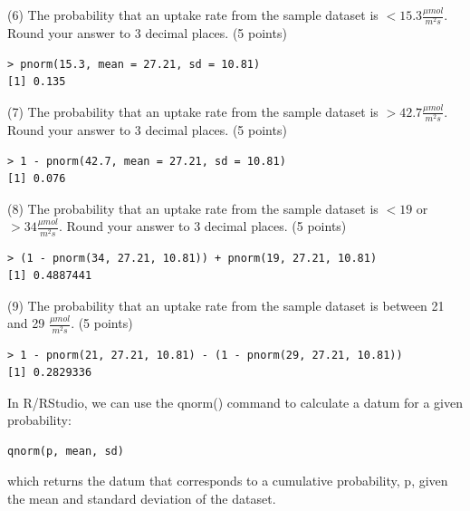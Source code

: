 \documentclass{article}
\begin{document}
 

(6) The probability that an uptake rate from the sample dataset is $<15.3 \frac{\mu mol}{m^{2}s}$. Round your answer to 3 decimal places. (5 points)

\begin{center}
\begin{lstlisting}
> pnorm(15.3, mean = 27.21, sd = 10.81)
[1] 0.135
\end{lstlisting}
\end{center}

(7) The probability that an uptake rate from the sample dataset is $>42.7 \frac{\mu mol}{m^{2}s}$. Round your answer to 3 decimal places. (5 points)

\begin{center}
\begin{lstlisting}
> 1 - pnorm(42.7, mean = 27.21, sd = 10.81)
[1] 0.076
\end{lstlisting}
\end{center}

(8) The probability that an uptake rate from the sample dataset is $< 19$ or $>34 \frac{\mu mol}{m^{2}s}$. Round your answer to 3 decimal places. (5 points)\\

\begin{center}
\begin{lstlisting}
> (1 - pnorm(34, 27.21, 10.81)) + pnorm(19, 27.21, 10.81)
[1] 0.4887441
\end{lstlisting}
\end{center}


(9) The probability that an uptake rate from the sample dataset is between 21 and 29 $\frac{\mu mol}{m^{2}s}$. (5 points)

\begin{center}
\begin{lstlisting}
> 1 - pnorm(21, 27.21, 10.81) - (1 - pnorm(29, 27.21, 10.81))
[1] 0.2829336
\end{lstlisting}
\end{center}

In R/RStudio, we can use the qnorm() command to calculate a datum for a given probability:
\begin{center}
\begin{lstlisting}
qnorm(p, mean, sd)
\end{lstlisting}
\end{center}


which returns the datum that corresponds to a cumulative probability, p, given the mean and standard deviation of the dataset.\\
\end{document}
